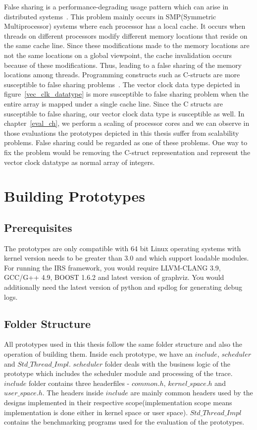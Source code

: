 False sharing is a performance-degrading usage pattern which can arise in distributed systems~\citep{torrellas1994false}. 
This problem mainly occurs in SMP(Symmetric Multiprocessor) systems where each processor has a local cache. 
It occurs when threads on different processors modify different memory locations that reside on the same cache line. 
Since these modifications made to the memory locations are not the same locations on a global viewpoint, the cache invalidation occurs because of these modifications. 
Thus, leading to a false sharing of the memory locations among threads. 
Programming constructs such as C-structs are more susceptible to false sharing problems~\citep{torrellas1994false}. 
The vector clock data type depicted in figure~\ref{vec_clk_datatype} is more susceptible to false sharing problem when the entire array is mapped under a single cache line. 
Since the C structs are susceptible to false sharing, our vector clock data type is susceptible as well. 
In chapter~\ref{eval_ch}, we perform a scaling of processor cores and we can observe in those evaluations the prototypes depicted in this thesis suffer from scalability problems. 
False sharing could be regarded as one of these problems. 
One way to fix the problem would be removing the C-struct representation and represent the vector clock datatype as normal array of integers.
 
\section{Building Prototypes}

\subsection*{Prerequisites}
The prototypes are only compatible with 64 bit Linux operating systems with kernel version needs to be greater than 3.0 and which support loadable modules. 
For running the IRS framework, you would require LLVM-CLANG 3.9, GCC/G++ 4.9, BOOST 1.6.2 and latest version of graphviz. 
You would additionally need the latest version of python and spdlog for generating debug logs. 


\subsection*{Folder Structure}
All prototypes used in this thesis follow the same folder structure and also the operation of building them. 
Inside each prototype, we have an $include$, $scheduler$ and $Std\_Thread\_Impl$. 
$scheduler$ folder deals with the business logic of the prototype which includes the scheduler module and processing of the trace. 
$include$ folder contains three headerfiles - $common.h$, $kernel\_space.h$ and $user\_space.h$. 
The headers inside $include$ are mainly common headers used by the designs implemented in their respective scope(implementation scope means implementation is done either in kernel space or user space). 
$Std\_Thread\_Impl$ contains the benchmarking programs used for the evaluation of the prototypes. 

